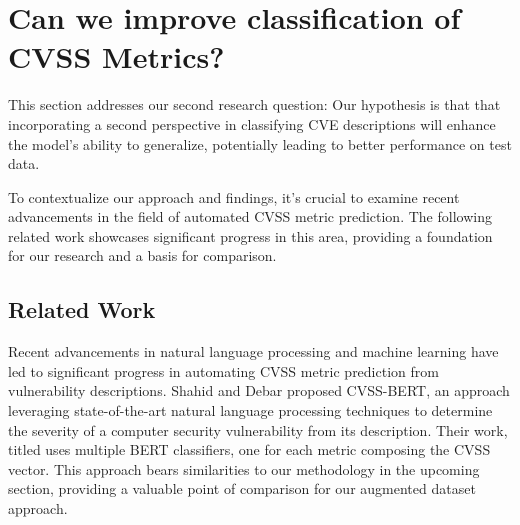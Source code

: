 \documentclass[12pt]{article}
\begin{document}


\section{Can we improve classification of CVSS Metrics?}\label{cvss_prediction}

This section addresses our second research question:  Our hypothesis is
that that incorporating a second perspective in classifying CVE descriptions will enhance the model's
ability to generalize, potentially leading to better performance on test data.

To contextualize our approach and findings, it's crucial to examine recent advancements in the field
of automated CVSS metric prediction. The following related work showcases significant progress in
this area, providing a foundation for our research and a basis for comparison.


\subsection{Related Work}


Recent advancements in natural language processing and machine learning have led to significant
progress in automating CVSS metric prediction from vulnerability descriptions. Shahid and Debar
\cite{cvss_bert} proposed CVSS-BERT, an approach leveraging state-of-the-art natural language
processing techniques to determine the severity of a computer security vulnerability from its
description. Their work, titled  uses multiple BERT
classifiers, one for each metric composing the CVSS vector. This approach bears similarities to our
methodology in the upcoming section, providing a valuable point of comparison for our augmented
dataset approach.
\end{document}
